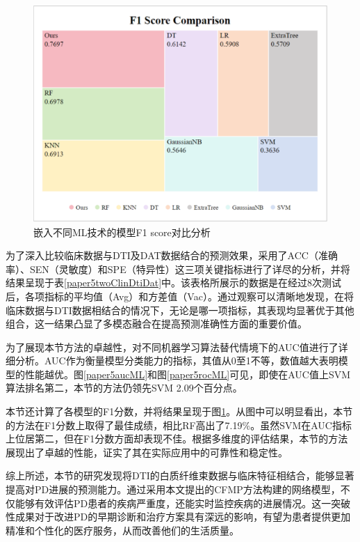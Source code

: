   \begin{figure}[ht]
      \centering
      \includegraphics[width=0.85\linewidth]{figs/paper5F1_MLs2.pdf}
      \caption{嵌入不同ML技术的模型F1 score对比分析 }\label{paper5F1_MLs}
     \end{figure}

为了深入比较临床数据与DTI及DAT数据结合的预测效果，采用了ACC（准确率）、SEN（灵敏度）和SPE（特异性）这三项关键指标进行了详尽的分析，并将结果呈现于表\ref{paper5twoClinDtiDat}中。该表格所展示的数据是在经过8次测试后，各项指标的平均值（Avg）和方差值（Vac）。通过观察可以清晰地发现，在将临床数据与DTI数据相结合的情况下，无论是哪一项指标，其表现均显著优于其他组合，这一结果凸显了多模态融合在提高预测准确性方面的重要价值。

为了展现本节方法的卓越性，对不同机器学习算法替代情境下的AUC值进行了详细分析。AUC作为衡量模型分类能力的指标，其值从0至1不等，数值越大表明模型的性能越优。图\ref{paper5aucML}和图\ref{paper5rocML}可见，即使在AUC值上SVM算法排名第二，本节的方法仍领先SVM 2.09个百分点。

本节还计算了各模型的F1分数，并将结果呈现于图\ref{paper5F1_MLs}。从图中可以明显看出，本节的方法在F1分数上取得了最佳成绩，相比RF高出了7.19\%。虽然SVM在AUC指标上位居第二，但在F1分数方面却表现不佳。根据多维度的评估结果，本节的方法展现出了卓越的性能，证实了其在实际应用中的可靠性和稳定性。

综上所述，本节的研究发现将DTI的白质纤维束数据与临床特征相结合，能够显著提高对PD进展的预测能力。通过采用本文提出的CFMP方法构建的网络模型，不仅能够有效评估PD患者的疾病严重度，还能实时监控疾病的进展情况。这一突破性成果对于改进PD的早期诊断和治疗方案具有深远的影响，有望为患者提供更加精准和个性化的医疗服务，从而改善他们的生活质量。

